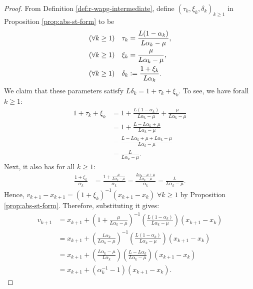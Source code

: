 \documentclass[12pt]{article}
\begin{document}
        \begin{proof}
            From Definition \ref{def:r-wapg-intermediate}, define $(\tau_k, \xi_k, \delta_k)_{k \ge 1}$ in Proposition \ref{prop:abs-st-form} to be
            \begin{align*}
                (\forall k \ge 1) \quad \tau_k &= \frac{L(1 - \alpha_k)}{L\alpha_k - \mu},
                \\
                (\forall k \ge 1)\quad 
                \xi_k &= \frac{\mu}{L \alpha_k - \mu},
                \\
                (\forall k \ge 1)\quad 
                \delta_k &\vcentcolon= \frac{1 + \xi_k}{L\alpha_k}. 
            \end{align*}
            We claim that these parameters satisfy $L\delta_k = 1 + \tau_k + \xi_k$. 
            To see, we have forall $k\ge 1$: 
            \begin{align*}
                1 + \tau_k + \xi_k &= 
                1 + \frac{L(1 - \alpha_k)}{L \alpha_k - \mu} 
                + \frac{\mu}{L \alpha_k - \mu}
                \\
                &= 
                1 + \frac{L - L \alpha_k + \mu}{L\alpha_k - \mu}
                \\
                &= 
                \frac{L - L \alpha_k + \mu + L \alpha_k - \mu}{L\alpha_k - \mu}
                \\
                &= \frac{L}{L\alpha_k - \mu}. 
            \end{align*}
            Next, it also has for all $k \ge 1$: 
            \begin{align*}
                \frac{1 + \xi_k}{\alpha_k}
                &= 
                \frac{1 + \frac{\mu}{L\alpha_k - \mu}}{\alpha_k}
                = 
                \frac{\frac{L\alpha_k - \mu + \mu}{L \alpha_k - \mu}}{\alpha_k}
                = 
                \frac{L}{L\alpha_k - \mu}.
            \end{align*}
            Hence,  $v_{k + 1} - x_{k + 1} = (1 + \xi_k)^{-1}(x_{k + 1} - x_k)\; \forall k \ge 1$ by Proposition \ref{prop:abs-st-form}.
            Therefore, substituting it gives: 
            \begin{align*}
                v_{k + 1} &= 
                x_{k + 1} + \left(
                    1 + \frac{\mu}{L\alpha_k - \mu}
                \right)^{-1}\left(
                    \frac{L(1 - \alpha_k)}{L\alpha_k - \mu}
                \right)(x_{k + 1} - x_k)
                \\
                &= 
                x_{k + 1} + \left(
                    \frac{L\alpha_k}{L\alpha_k - \mu}
                \right)^{-1}\left(
                    \frac{L(1 - \alpha_k)}{L\alpha_k - \mu}
                \right)(x_{k + 1} - x_k)
                \\
                &= 
                x_{k + 1} + \left(
                    \frac{L\alpha_k - \mu}{L\alpha_k}
                \right)\left(
                    \frac{L - L\alpha_k}{L\alpha_k - \mu}
                \right)(x_{k + 1} - x_k)
                \\
                &= x_{k + 1} + (\alpha_k^{-1} - 1)(x_{k + 1} - x_k). 
            \end{align*}
        \end{proof}
\end{document}
